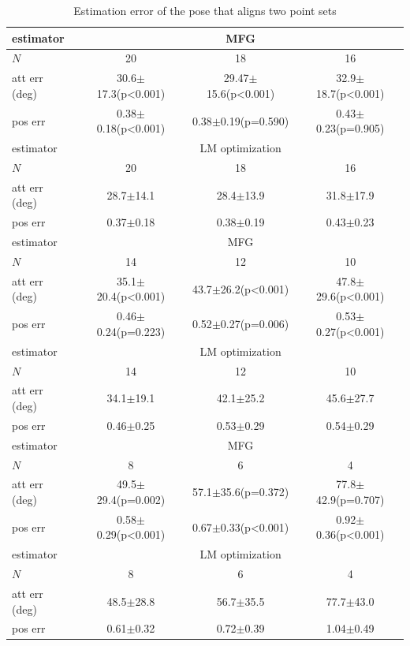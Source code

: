 \begin{table}
	\centering
	\caption{Estimation error of the pose that aligns two point sets}
	\label{tab:VIO-pose-error}
	\small
	\begin{tabular}{l|ccc}
		\hline\hline
		estimator & \multicolumn{3}{c}{MFG} \\ \hline
		$N$ & 20 & 18 & 16 \\ \hline
		att err (deg) & 30.6$\pm$17.3(p<0.001) & 29.47$\pm$15.6(p<0.001) & 32.9$\pm$18.7(p<0.001) \\
		pos err & 0.38$\pm$0.18(p<0.001) & 0.38$\pm$0.19(p=0.590) & 0.43$\pm$0.23(p=0.905) \\
		\midrule[1.2pt]
		estimator & \multicolumn{3}{c}{LM optimization} \\ \hline
		$N$ & 20 & 18 & 16 \\ \hline
		att err (deg) & 28.7$\pm$14.1 & 28.4$\pm$13.9 & 31.8$\pm$17.9 \\
		pos err & 0.37$\pm$0.18 & 0.38$\pm$0.19 & 0.43$\pm$0.23 \\
		\hline\hline
		estimator & \multicolumn{3}{c}{MFG} \\ \hline
		$N$ & 14 & 12 & 10  \\ \hline
		att err (deg) & 35.1$\pm$20.4(p<0.001) & 43.7$\pm$26.2(p<0.001) & 47.8$\pm$29.6(p<0.001) \\
		pos err & 0.46$\pm$0.24(p=0.223) & 0.52$\pm$0.27(p=0.006) & 0.53$\pm$0.27(p<0.001) \\
		\midrule[1.2pt]
		estimator & \multicolumn{3}{c}{LM optimization} \\ \hline
		$N$ & 14 & 12 & 10 \\ \hline
		att err (deg) & 34.1$\pm$19.1 & 42.1$\pm$25.2 & 45.6$\pm$27.7 \\
		pos err & 0.46$\pm$0.25 & 0.53$\pm$0.29 & 0.54$\pm$0.29 \\
		\hline\hline
		estimator & \multicolumn{3}{c}{MFG} \\ \hline
		$N$ & 8 & 6 & 4 \\ \hline
		att err (deg) & 49.5$\pm$29.4(p=0.002) & 57.1$\pm$35.6(p=0.372) & 77.8$\pm$42.9(p=0.707)  \\
		pos err & 0.58$\pm$0.29(p<0.001) & 0.67$\pm$0.33(p<0.001) & 0.92$\pm$0.36(p<0.001) \\
		\midrule[1.2pt]
		estimator & \multicolumn{3}{c}{LM optimization} \\ \hline
		$N$ & 8 & 6 & 4 \\ \hline
		att err (deg) & 48.5$\pm$28.8 & 56.7$\pm$35.5 & 77.7$\pm$43.0  \\
		pos err & 0.61$\pm$0.32 & 0.72$\pm$0.39 & 1.04$\pm$0.49 \\
		\hline\hline
	\end{tabular}
\end{table}

